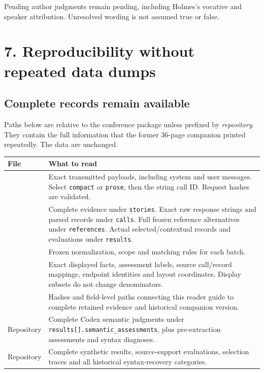 Pending author judgments remain pending, including Holmes's vocative and speaker attribution. Unresolved wording is not assumed true or false.

\clearpage
\section*{7. Reproducibility without repeated data dumps}
\subsection*{Complete records remain available}
Paths below are relative to the conference package unless prefixed by \emph{repository}. They contain the full information that the former 36-page companion printed repeatedly. The data are unchanged.

\begin{tabular}{L{46mm}L{104mm}}
\toprule
File & What to read\\\midrule
{} & Exact transmitted payloads, including system and user messages. Select \texttt{compact} or \texttt{prose}, then the string call ID. Request hashes are validated.\\
 & Complete evidence under \texttt{stories}. Exact raw response strings and parsed records under \texttt{calls}. Full frozen reference alternatives under \texttt{references}. Actual selected/contextual records and evaluations under \texttt{results}.\\
 & Frozen normalization, scope and matching rules for each batch.\\
 & Exact displayed facts, assessment labels, source call/record mappings, endpoint identities and layout coordinates. Display subsets do not change denominators.\\
 & Hashes and field-level paths connecting this reader guide to complete retained evidence and historical companion version.\\
Repository  & Complete Codex semantic judgments under \texttt{results[].semantic\_assessments}, plus pre-extraction assessments and syntax diagnoses.\\
Repository  & Complete synthetic results, source-support evaluations, selection traces and all historical syntax-recovery categories.\\
\bottomrule
\end{tabular}

